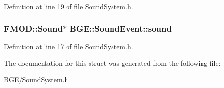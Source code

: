 Definition at line 19 of file Sound\-System.\-h.

\hypertarget{struct_b_g_e_1_1_sound_event_ab7bb299636b2efed16e6a7d99c08053a}{
\subsubsection[{sound}]{\setlength{\rightskip}{0pt plus 5cm}F\-M\-O\-D\-::\-Sound$\ast$ B\-G\-E\-::\-Sound\-Event\-::sound}}\label{struct_b_g_e_1_1_sound_event_ab7bb299636b2efed16e6a7d99c08053a}


Definition at line 17 of file Sound\-System.\-h.



The documentation for this struct was generated from the following file\-:\begin{DoxyCompactItemize}
\item 
B\-G\-E/\hyperlink{_sound_system_8h}{Sound\-System.\-h}\end{DoxyCompactItemize}
